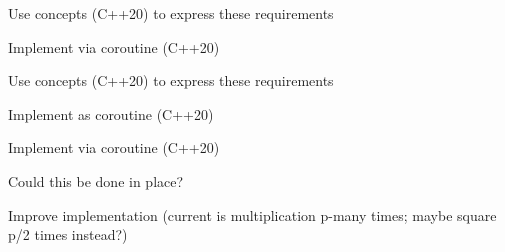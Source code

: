 
\begin{DoxyRefList}
\item[Class \mbox{\hyperlink{classsymmp_1_1BaseContainer}{Base\+Container$<$ exp\+\_\+t $>$}} ]\label{todo__todo000004}%
%
Use concepts (C++20) to express these requirements 
\item[Class \mbox{\hyperlink{classsymmp_1_1CombinationGenerator}{Combination\+Generator$<$ T $>$}} ]\label{todo__todo000003}%
%
Implement via coroutine (C++20)  
\item[Class \mbox{\hyperlink{classsymmp_1_1DefaultContainer}{Default\+Container$<$ \+\_\+scl, \+\_\+exp, \+\_\+cnt, \+\_\+ord, \+\_\+arg $>$}} ]\label{todo__todo000005}%
%
Use concepts (C++20) to express these requirements 
\item[Class \mbox{\hyperlink{classsymmp_1_1FactoryGenerator}{Factory\+Generator$<$ spec\+\_\+t, gen\+\_\+t $>$}} ]\label{todo__todo000001}%
%
Implement as coroutine (C++20)  
\item[Class \mbox{\hyperlink{classsymmp_1_1PermutationGenerator}{Permutation\+Generator$<$ T $>$}} ]\label{todo__todo000002}%
%
Implement via coroutine (C++20)  
\item[Member \mbox{\hyperlink{classsymmp_1_1Polynomial_a3952b5f6fd4e4511308c25378410a681}{Polynomial$<$ container\+\_\+t $>$\+::operator$\ast$=}} (const \mbox{\hyperlink{classsymmp_1_1Polynomial}{Polynomial}} \&other)]\label{todo__todo000006}%
%
Could this be done in place?  
\item[Member \mbox{\hyperlink{classsymmp_1_1Polynomial_a70067a1e044cd9ad3172e18f870555d8}{Polynomial$<$ container\+\_\+t $>$\+::operator$^\wedge$}} (T p) const]\label{todo__todo000007}%
%
Improve implementation (current is multiplication p-\/many times; maybe square p/2 times instead?) 
\end{DoxyRefList}